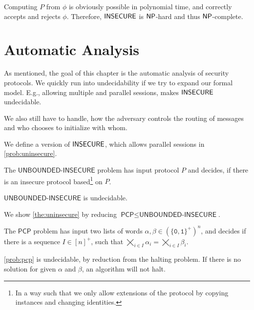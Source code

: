 Computing \(P\) from \(\phi\) is obviously possible in polynomial time, and correctly accepts and rejects \(\phi\).
Therefore, \(\textsf{INSECURE}\) is \(\textsf{NP}\)-hard and thus \(\textsf{NP}\)-complete.

\section{Automatic Analysis}
As mentioned, the goal of this chapter is the automatic analysis of security protocols.
We quickly run into undecidability if we try to expand our formal model.
E.g., allowing multiple and parallel sessions, makes \(\textsf{INSECURE}\) undecidable.

We also still have to handle, how the adversary controls the routing of messages and who chooses to initialize with whom.

We define a version of \(\textsf{INSECURE}\), which allows parallel sessions in \cref{prob:uninsecure}.

\newcommand{\UnInsecure}{\textsf{UNBOUNDED-INSECURE}}

\begin{problem}\label{prob:uninsecure}
    The \(\UnInsecure\) problem has input protocol \(P\) and decides, if there is an insecure protocol based\footnote{In a way such that we only allow extensions of the protocol by copying instances and changing identities.} on \(P\).
\end{problem}

\begin{theorem}\label{the:uninsecure}
    \(\UnInsecure\) is undecidable.
\end{theorem}

\newcommand{\PCP}{\textsf{PCP}}

We show \cref{the:uninsecure} by reducing \(\PCP \le \UnInsecure\).

\newcommand{\0}{\texttt{0}}
\newcommand{\1}{\texttt{1}}

\begin{problem}\label{prob:pcp}
    The \(\PCP\) problem has input two lists of words \(\alpha, \beta \in (\{\0, \1\}^+)^n\), and decides if there is a sequence \(I \in [n]^+\), such that \(\bigtimes_{i \in I}\alpha_i = \bigtimes_{i \in I}\beta_i\).
\end{problem}

\cref{prob:pcp} is undecidable, by reduction from the halting problem.
If there is no solution for given \(\alpha\) and \(\beta\), an algorithm will not halt.

